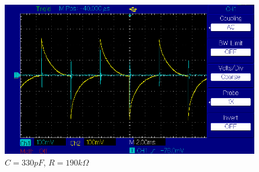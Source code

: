 \documentclass{article}
\begin{document}
\begin{figure}[!h]
        \caption{$C = 330 pF$, $R = 190 k\Omega$}
        \label{img:c33e1_r190}
    \endminipage\hfill
        \centering
        \includegraphics[width=\linewidth]{figures/results/resistor_190_Ohm/c680pF.png}
        \caption{$C = 330 pF$, $R = 190 k\Omega$}
        \label{img:c68e1_r190}
    \endminipage\hfill
\end{figure}
\end{document}
